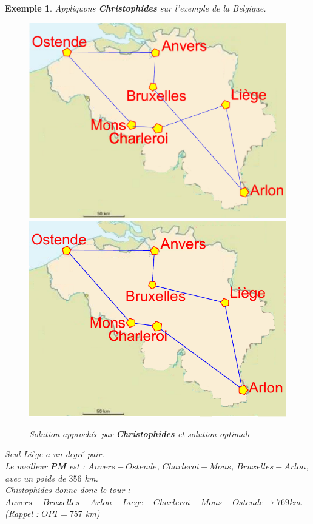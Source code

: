 \documentclass[12pt]{article}
\newtheorem{exemple}{Exemple}[section]
\begin{document}
\begin{exemple} Appliquons \textbf{Christophides} sur l'exemple de la Belgique. \\
\begin{figure}[h!]
    \begin{center}
    \includegraphics[scale=0.28]{belgiqueCHRIS.pdf}
    \includegraphics[scale=0.5]{belgiqueOPT.pdf}
    \caption{Solution approchée par \textbf{Christophides} et solution optimale}
    \end{center}
\end{figure}

\noindent Seul Liège a un degré pair. \\
Le meilleur \textbf{PM} est : $Anvers-Ostende$, $Charleroi-Mons$, $Bruxelles-Arlon$, avec un poids de $356$ km. \\
Chistophides donne donc le tour : \\ $Anvers-Bruxelles-Arlon-Liege-Charleroi-Mons-Ostende \rightarrow 769$km. \\
\textit{(Rappel : $OPT = 757$ km)}
\end{exemple}
\end{document}
